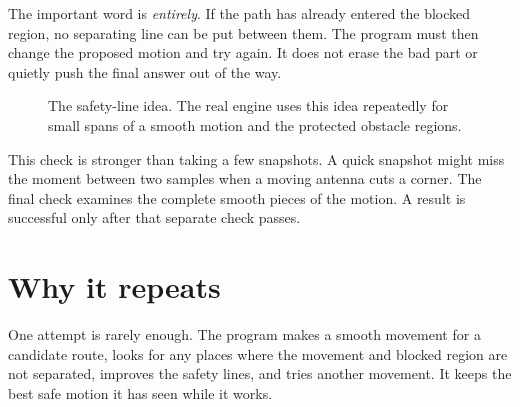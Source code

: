 \documentclass[10pt,letterpaper]{article}
\begin{document}
The important word is \emph{entirely}. If the path has already entered the
blocked region, no separating line can be put between them. The program must
then change the proposed motion and try again. It does not erase the bad part
or quietly push the final answer out of the way.

\begin{figure}[ht]
\centering
{}
\caption{The safety-line idea. The real engine uses this idea repeatedly for
small spans of a smooth motion and the protected obstacle regions.}
\label{fig:safetyline}
\end{figure}

This check is stronger than taking a few snapshots. A quick snapshot might miss
the moment between two samples when a moving antenna cuts a corner. The final
check examines the complete smooth pieces of the motion. A result is successful
only after that separate check passes.

\section{Why it repeats}

One attempt is rarely enough. The program makes a smooth movement for a
candidate route, looks for any places where the movement and blocked region are
not separated, improves the safety lines, and tries another movement. It keeps
the best safe motion it has seen while it works.
\end{document}
